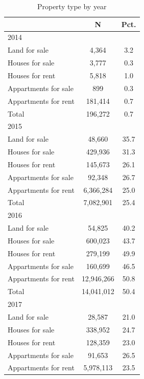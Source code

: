 \begin{table}[htbp]\centering
\def\sym#1{\ifmmode^{#1}\else\(^{#1}\)\fi}
\caption{Property type by year}
\begin{tabular}{l*{1}{cc}}
\toprule
            &           N&        Pct.\\
\midrule
2014        &            &            \\
Land for sale&       4,364&         3.2\\
Houses for sale&       3,777&         0.3\\
Houses for rent&       5,818&         1.0\\
Appartments for sale&         899&         0.3\\
Appartments for rent&     181,414&         0.7\\
Total       &     196,272&         0.7\\
\midrule
2015        &            &            \\
Land for sale&      48,660&        35.7\\
Houses for sale&     429,936&        31.3\\
Houses for rent&     145,673&        26.1\\
Appartments for sale&      92,348&        26.7\\
Appartments for rent&   6,366,284&        25.0\\
Total       &   7,082,901&        25.4\\
\midrule
2016        &            &            \\
Land for sale&      54,825&        40.2\\
Houses for sale&     600,023&        43.7\\
Houses for rent&     279,199&        49.9\\
Appartments for sale&     160,699&        46.5\\
Appartments for rent&  12,946,266&        50.8\\
Total       &  14,041,012&        50.4\\
\midrule
2017        &            &            \\
Land for sale&      28,587&        21.0\\
Houses for sale&     338,952&        24.7\\
Houses for rent&     128,359&        23.0\\
Appartments for sale&      91,653&        26.5\\
Appartments for rent&   5,978,113&        23.5\\

\end{tabular}
\end{table}
